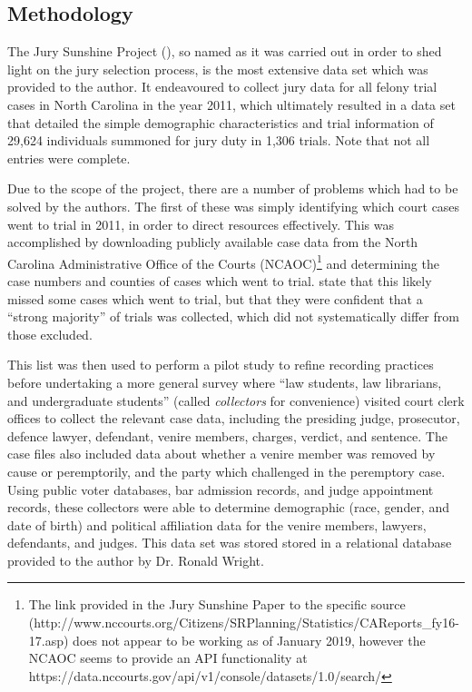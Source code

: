 \subsection{Methodology}

The Jury Sunshine Project (\cite{JurySunshineProj}), so named as it was carried out in order to shed light on the jury
selection process, is the most extensive data set which was provided to the author. It endeavoured to collect jury data for all
felony trial cases in North Carolina in the year 2011, which ultimately resulted in a data set that detailed the simple
demographic characteristics and trial information of 29,624 individuals summoned for jury duty in 1,306 trials. Note that not all
entries were complete.

Due to the scope of the project, there are a number of problems which had to be solved by the authors. The first of these was
simply identifying which court cases went to trial in 2011, in order to direct resources effectively. This was accomplished by
downloading publicly available case data from the North Carolina Administrative Office of the Courts (NCAOC)\footnote{The link provided in
  the Jury Sunshine Paper to the specific source (http://www.nccourts.org/Citizens/SRPlanning/Statistics/CAReports\_fy16-17.asp)
  does not appear to be working as of January 2019, however the NCAOC seems to provide an API functionality at
  https://data.nccourts.gov/api/v1/console/datasets/1.0/search/} and determining the case numbers and counties of cases which went
to trial. \citeauthor{JurySunshineProj} state that this likely missed some cases which went to trial, but that they were
confident that a ``strong majority'' of trials was collected, which did not systematically differ from those excluded.

This list was then used to perform a pilot study to refine recording practices before undertaking a more general survey where
``law students, law librarians, and undergraduate students'' (called \textit{collectors} for convenience) visited court clerk
offices to collect the relevant case data, including the presiding judge, prosecutor, defence lawyer, defendant, venire members,
charges, verdict, and sentence. The case files also included data about whether a venire member was removed by cause or
peremptorily, and the party which challenged in the peremptory case. Using public voter databases, bar admission records, and
judge appointment records, these collectors were able to determine demographic (race, gender, and date of birth) and political
affiliation data for the venire members, lawyers, defendants, and judges. This data set was stored stored in a relational database
provided to the author by Dr. Ronald Wright.

